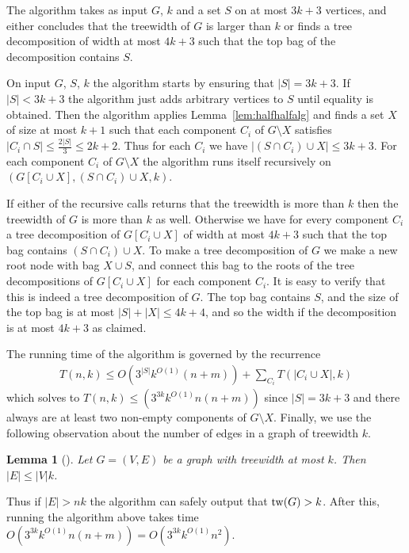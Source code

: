 \documentclass[a4paper,11pt]{article}
\newtheorem{lemma}{Lemma}[section]
\theoremstyle{definition}
\theoremstyle{remark}
\begin{document}
The algorithm takes as input $G$, $k$ and a set $S$ on at most $3k+3$
vertices, and either concludes that the treewidth of $G$ is larger
than $k$ or finds a tree decomposition of width at most $4k+3$ such
that the top bag of the decomposition contains $S$.

On input $G$, $S$, $k$ the algorithm starts by ensuring that
$|S|=3k+3$.  If $|S| < 3k+3$ the algorithm just adds arbitrary
vertices to $S$ until equality is obtained.  Then the algorithm
applies Lemma~\ref{lem:halfhalfalg} and finds a set $X$ of size at
most $k+1$ such that each component $C_i$ of $G \setminus X$ satisfies
$|C_i \cap S| \leq \frac{2|S|}{3} \leq 2k+2$.  Thus for each $C_i$ we
have $|(S \cap C_i) \cup X| \leq 3k+3$.  For each component $C_i$ of
$G \setminus X$ the algorithm runs itself recursively on $(G[C_i \cup
X], (S \cap C_i) \cup X, k)$.

If either of the recursive calls returns that the treewidth is more
than $k$ then the treewidth of $G$ is more than $k$ as well.
Otherwise we have for every component $C_i$ a tree decomposition of
$G[C_i \cup X]$ of width at most $4k+3$ such that the top bag contains
$(S \cap C_i) \cup X$.  To make a tree decomposition of $G$ we make a
new root node with bag $X \cup S$, and connect this bag to the roots
of the tree decompositions of $G[C_i \cup X]$ for each component
$C_i$.  It is easy to verify that this is indeed a tree decomposition
of $G$.  The top bag contains $S$, and the size of the top bag is at
most $|S|+|X| \leq 4k+4$, and so the width if the decomposition is at
most $4k+3$ as claimed.

The running time of the algorithm is governed by the recurrence
\begin{align}\label{eqn:gm13} T(n,k) \leq O(3^{|S|}k^{O(1)}(n+m)) +
  \sum_{C_i} T(|C_i \cup X|, k) \end{align} which solves to $T(n,k) \leq
(3^{3k}k^{O(1)}n(n+m))$ since $|S|=3k+3$ and there always are at least
two non-empty components of $G \setminus X$.  Finally, we use the
following observation about the number of edges in a graph of
treewidth $k$.

\begin{lemma}[\cite{BodlaenderF05a}]
  \label{lemma:prelim:nk-edges}
  Let $G = (V,E)$ be a graph with treewidth at most $k$.  Then $|E|
  \leq |V|k$.
\end{lemma}


Thus if $|E| > nk$ the algorithm can safely output that $\mathrm{tw}(G) > k$.
After this, running the algorithm above takes time
$O(3^{3k}k^{O(1)}n(n+m)) = O(3^{3k}k^{O(1)}n^2)$.
\end{document}
